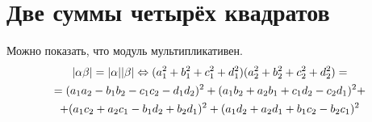 \section{Две суммы четырёх квадратов}

Можно показать, что модуль мультипликативен.
\begin{gather*}
|\alpha \beta| = |\alpha||\beta| \Leftrightarrow (a_1^2+b_1^2+c_1^2+d_1^2)(a_2^2+b_2^2+c_2^2+d_2^2) = \\
= (a_1a_2 - b_1b_2 - c_1c_2 - d_1d_2)^2 + (a_1b_2 + a_2b_1 + c_1d_2 - c_2d_1)^2 + \\
+ (a_1c_2 + a_2c_1 - b_1d_2 + b_2d_1)^2 + (a_1d_2 + a_2d_1 + b_1c_2 - b_2c_1)^2
\end{gather*}
